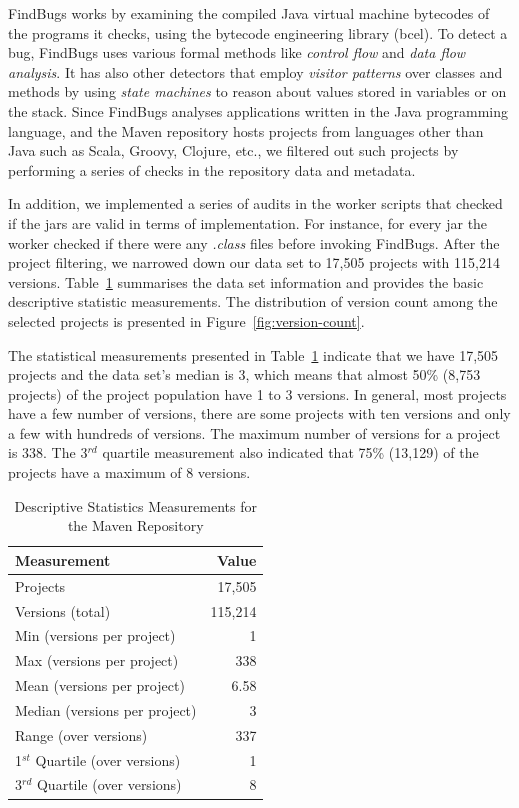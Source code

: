 \documentclass[letterpaper,twocolumn,10pt]{article}
\begin{document}
FindBugs works by examining the compiled Java virtual
machine bytecodes of the programs it checks, using the bytecode engineering
library ({\sc bcel}).
To detect a bug, FindBugs uses various formal methods like
{\it control flow} and {\it data flow
analysis}. It has also other detectors that employ {\it visitor patterns} over
classes and methods by using {\it state machines} to reason about values stored
in variables or on the stack.
Since FindBugs analyses applications written in the Java
programming language, and the Maven repository
hosts projects from languages other than Java such as Scala, Groovy,
Clojure, etc., we filtered out such projects by performing a series of checks in
the repository data and metadata.

In addition, we implemented a series of audits in the worker scripts that
checked if the {\sc jar}s are valid in terms of implementation. For instance,
for every {\sc jar} the worker checked if there were any {\it .class} files
before invoking FindBugs. After the project filtering, we narrowed down
our data set to 17,505 projects with 115,214 versions.
Table~\ref{tbl:repository} summarises the data set information and
provides the basic descriptive statistic measurements. The distribution of version
count among the selected projects is presented in Figure~\ref{fig:version-count}.

The statistical measurements presented in Table~\ref{tbl:repository}
indicate that we have 17,505 projects and the data set's median is 3,
which means that almost 50\% (8,753 projects) of the project
population have 1 to 3 versions. In general, most projects have a few
number of versions, there are some projects with ten versions and
only a few with hundreds of versions. The maximum number of versions
for a project is 338. The 3$^{rd}$ quartile measurement also indicated
that 75\% (13,129) of the projects have a maximum of 8 versions.

\begin{table}[t]
\centering
\caption{Descriptive Statistics Measurements for the Maven Repository}
\label{tbl:repository}
\begin{tabular}{l r}
\hline
Measurement & Value\\
 \hline
Projects & 17,505\\
Versions (total) & 115,214\\
Min (versions per project) & 1\\
Max (versions per project) & 338\\
Mean (versions per project) & 6.58\\
Median (versions per project) & 3\\
Range (over versions) & 337\\
1$^{st}$ Quartile (over versions) & 1\\
3$^{rd}$ Quartile (over versions) & 8\\
\hline
\end{tabular}
\end{table}
\end{document}
